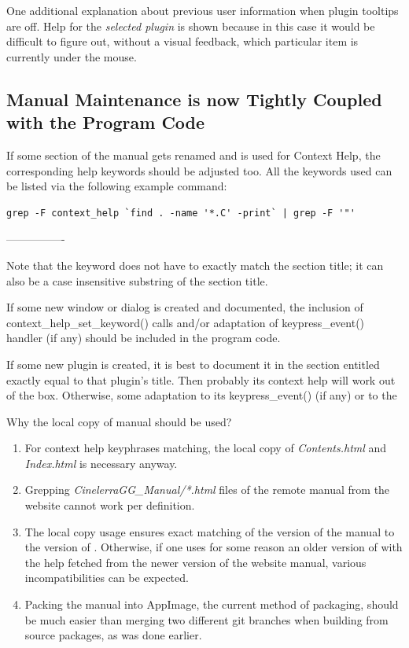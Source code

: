 One additional explanation about previous user information when plugin tooltips are off. Help for the \textit {selected plugin} is shown because in this case it would be difficult to figure out, without a visual feedback, which particular item is currently under the mouse.

\subsection{Manual Maintenance is now Tightly Coupled with the Program Code}
\label{sub:manmaintain}

If some section of the \CGG{} manual gets renamed and is used for Context Help, the corresponding help keywords should be adjusted too. All the keywords used can be listed via the following example command:

\begin{lstlisting}[style=sh]
	grep -F context_help `find . -name '*.C' -print` | grep -F '"'
\end{lstlisting}
----------------

Note that the keyword does not have to exactly match the section title; it can also be a case insensitive substring of the section title.

If some new \CGG{} window or dialog is created and documented, the inclusion of context\_help\_set\_keyword() calls and/or adaptation of keypress\_event() handler (if any) should be included in the program code.

If some new \CGG{} plugin is created, it is best to document it in the section entitled exactly equal to that plugin's title. Then probably its context help will work out of the box. Otherwise, some adaptation to its keypress\_event() (if any) or to the %

Why the local copy of \CGG{} manual should be used?

\begin{enumerate}
	\item For context help keyphrases matching, the local copy of \textit{Contents.html} and \textit{Index.html} is necessary anyway.
	\item Grepping \textit{CinelerraGG\_Manual/*.html} files of the remote manual from the website cannot work per definition.
	\item The local copy usage ensures exact matching of the version of the manual to the version of \CGG{}. Otherwise, if one uses for some reason an older version of \CGG{} with the help fetched from the newer version of the website manual, various incompatibilities can be expected.
	\item Packing the manual into AppImage, the current method of \CGG{} packaging, should be much easier than merging two different git branches when building from source packages, as was done earlier.
\end{enumerate}

